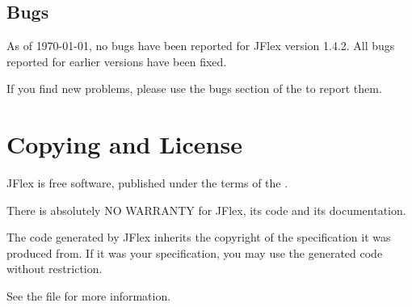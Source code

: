 \documentclass[11pt]{scrartcl}
\newcommand{\ver}{1.4.2}
\begin{document}
\subsection{Bugs}
As of {\today}, no bugs have been reported for JFlex version \ver. All 
bugs reported for earlier versions have been fixed.

If you find new problems, please use the bugs section of the
to report them.
 
 
\section{Copying and License\label{Copyright}}
JFlex is free software, published under the terms of the 
.

There is absolutely NO WARRANTY for JFlex, its code and its documentation.

The code generated by JFlex inherits the copyright of the specification it
was produced from. If it was your specification, you may use the generated 
code without restriction.

See the file  for more information.  
\end{document}
